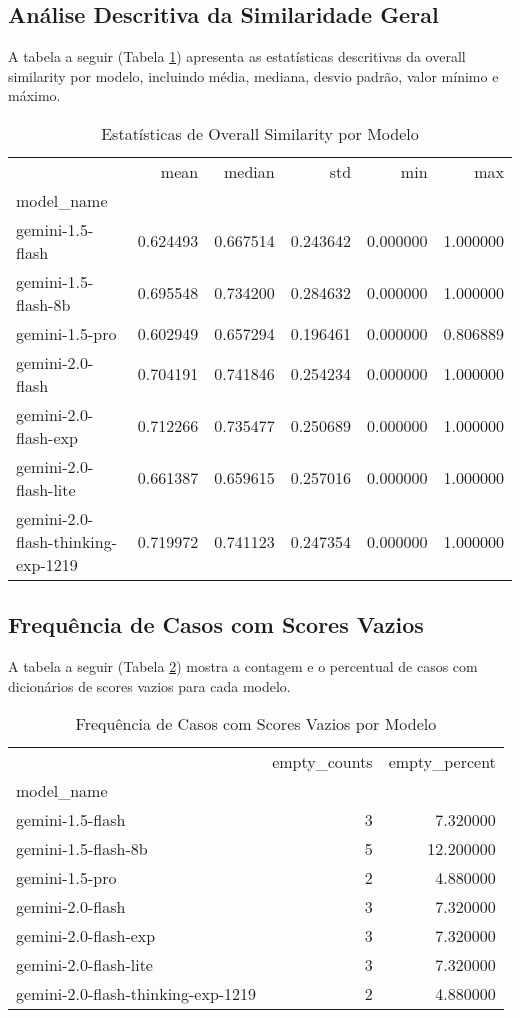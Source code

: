 \documentclass{article}%
\begin{document}
\subsection*{Análise Descritiva da Similaridade Geral}%
\label{subsec:AnliseDescritivadaSimilaridadeGeral}%
A tabela a seguir (Tabela \ref{tab:overall_stats}) apresenta as estatísticas descritivas da overall similarity por modelo, incluindo média, mediana, desvio padrão, valor mínimo e máximo.%
\begin{table}[H]%
\centering%
\caption{Estatísticas de Overall Similarity por Modelo}\label{tab:overall_stats}%
\begin{tabular}{lrrrrr}
\toprule
 & mean & median & std & min & max \\
model_name &  &  &  &  &  \\
\midrule
gemini-1.5-flash & 0.624493 & 0.667514 & 0.243642 & 0.000000 & 1.000000 \\
gemini-1.5-flash-8b & 0.695548 & 0.734200 & 0.284632 & 0.000000 & 1.000000 \\
gemini-1.5-pro & 0.602949 & 0.657294 & 0.196461 & 0.000000 & 0.806889 \\
gemini-2.0-flash & 0.704191 & 0.741846 & 0.254234 & 0.000000 & 1.000000 \\
gemini-2.0-flash-exp & 0.712266 & 0.735477 & 0.250689 & 0.000000 & 1.000000 \\
gemini-2.0-flash-lite & 0.661387 & 0.659615 & 0.257016 & 0.000000 & 1.000000 \\
gemini-2.0-flash-thinking-exp-1219 & 0.719972 & 0.741123 & 0.247354 & 0.000000 & 1.000000 \\
\bottomrule
\end{tabular}
%
\end{table}

%
\subsection*{Frequência de Casos com Scores Vazios}%
\label{subsec:FrequnciadeCasoscomScoresVazios}%
A tabela a seguir (Tabela \ref{tab:empty_scores}) mostra a contagem e o percentual de casos com dicionários de scores vazios para cada modelo.%
\begin{table}[H]%
\centering%
\caption{Frequência de Casos com Scores Vazios por Modelo}\label{tab:empty_scores}%
\begin{tabular}{lrr}
\toprule
 & empty\_counts & empty\_percent \\
model_name &  &  \\
\midrule
gemini-1.5-flash & 3 & 7.320000 \\
gemini-1.5-flash-8b & 5 & 12.200000 \\
gemini-1.5-pro & 2 & 4.880000 \\
gemini-2.0-flash & 3 & 7.320000 \\
gemini-2.0-flash-exp & 3 & 7.320000 \\
gemini-2.0-flash-lite & 3 & 7.320000 \\
gemini-2.0-flash-thinking-exp-1219 & 2 & 4.880000 \\
\bottomrule
\end{tabular}
%
\end{table}
\end{document}
